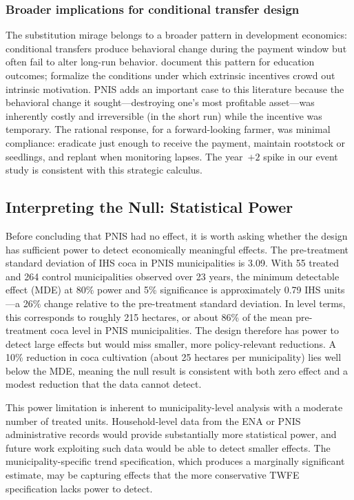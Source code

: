 \documentclass[12pt]{article}
\begin{document}
\subsubsection*{Broader implications for conditional transfer design} The substitution mirage belongs to a broader pattern in development economics: conditional transfers produce behavioral change during the payment window but often fail to alter long-run behavior. \citet{baird2019} document this pattern for education outcomes; \citet{gneezy2011} formalize the conditions under which extrinsic incentives crowd out intrinsic motivation. PNIS adds an important case to this literature because the behavioral change it sought---destroying one's most profitable asset---was inherently costly and irreversible (in the short run) while the incentive was temporary. The rational response, for a forward-looking farmer, was minimal compliance: eradicate just enough to receive the payment, maintain rootstock or seedlings, and replant when monitoring lapses. The year~$+2$ spike in our event study is consistent with this strategic calculus.

\subsection{Interpreting the Null: Statistical Power}

Before concluding that PNIS had no effect, it is worth asking whether the design has sufficient power to detect economically meaningful effects. The pre-treatment standard deviation of IHS coca in PNIS municipalities is 3.09. With 55 treated and 264 control municipalities observed over 23 years, the minimum detectable effect (MDE) at 80\% power and 5\% significance is approximately 0.79 IHS units---a 26\% change relative to the pre-treatment standard deviation. In level terms, this corresponds to roughly 215 hectares, or about 86\% of the mean pre-treatment coca level in PNIS municipalities. The design therefore has power to detect large effects but would miss smaller, more policy-relevant reductions. A 10\% reduction in coca cultivation (about 25 hectares per municipality) lies well below the MDE, meaning the null result is consistent with both zero effect and a modest reduction that the data cannot detect.

This power limitation is inherent to municipality-level analysis with a moderate number of treated units. Household-level data from the ENA or PNIS administrative records would provide substantially more statistical power, and future work exploiting such data would be able to detect smaller effects. The municipality-specific trend specification, which produces a marginally significant estimate, may be capturing effects that the more conservative TWFE specification lacks power to detect.
\end{document}

